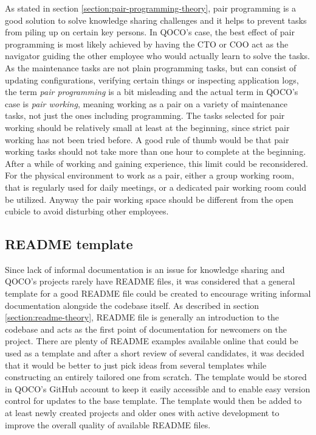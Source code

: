 As stated in section \ref{section:pair-programming-theory}, pair programming
is a good solution to solve knowledge sharing challenges and it helps to prevent tasks from piling up on certain key persons. In QOCO's case, the best effect of pair programming
is most likely achieved by having the CTO or COO act as the navigator guiding the other employee who would actually learn to solve the tasks. As the maintenance tasks are not plain programming tasks, but
can consist of updating configurations, verifying certain things or inspecting application logs, the term \emph{pair programming} is a bit misleading and the actual term in QOCO's case is \emph{pair working},
meaning working as a pair on a variety of maintenance tasks, not just the ones including programming. The tasks selected for pair working should be relatively small at least at the beginning,
since strict pair working has not been tried before. A good rule of thumb would be that pair working tasks should not take more than one hour to complete at the beginning. After a while of working and gaining
experience, this limit could be reconsidered. For the physical environment to work as a pair, either a group working room, that is regularly used for daily meetings, or a dedicated pair working room
could be utilized. Anyway the pair working space should be different from the open cubicle to avoid disturbing other employees.

\subsection{README template}
\label{section:readme}

Since lack of informal documentation is an issue for knowledge sharing and QOCO's projects rarely have README files, it was considered that a general template for a good
README file could be created to encourage writing informal documentation alongside the codebase itself. As described in section \ref{section:readme-theory}, README file
is generally an introduction to the codebase and acts as the first point of documentation for newcomers on the project.
There are plenty of README examples available online that could be used as a template and after a short review of several candidates, it was decided that it would be better to
just pick ideas from several templates while constructing an entirely tailored one from scratch. The template would be stored in QOCO's GitHub account to keep it easily accessible and to enable easy
version control for updates to the base template. The template would then be added to at least newly created projects and older ones with active development to improve
the overall quality of available README files.

